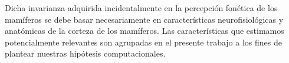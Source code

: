 Dicha invarianza adquirida incidentalmente en la percepción fonética de los mamíferos se debe basar necesariamente en características neurofisiológicas y anatómicas de la corteza de los mamíferos. Las características que estimamos potencialmente relevantes son agrupadas en el presente trabajo a los fines de plantear nuestras hipótesis computacionales.











